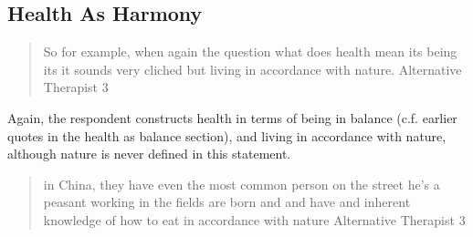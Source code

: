 







\subsection{Health As Harmony}
\label{sec:health-as-harmony}

\begin{quotation}
   So for example, when again the question what does health mean its being its it sounds very cliched but living in accordance with nature.
Alternative Therapist 3
\end{quotation}

Again, the respondent constructs health in terms of being in balance (c.f. earlier quotes in the health as balance section),  and living in accordance with nature, although nature is never defined in this statement. 

\begin{quotation}
   in China, they have even the most common person on the street he's a peasant working in the fields are born and and have and inherent knowledge of how to eat in accordance with nature 
Alternative Therapist 3
\end{quotation}

